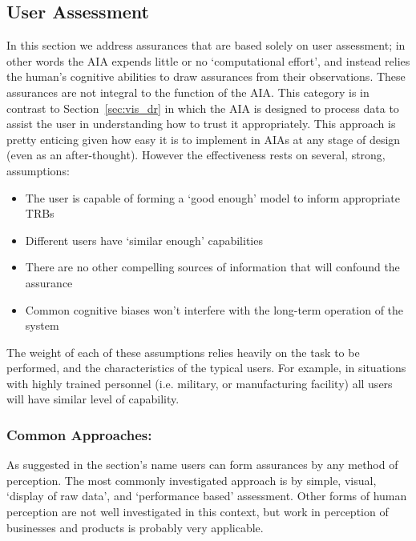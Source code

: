 
\subsection{User Assessment} \label{sec:user_assessment}
In this section we address assurances that are based solely on user assessment; in other words the AIA expends little or no `computational effort', and instead relies the human's cognitive abilities to draw assurances from their observations. These  assurances are not integral to the function of the AIA. This category is in contrast to Section~\ref{sec:vis_dr} in which the AIA is designed to process data to assist the user in understanding how to trust it appropriately. This approach is pretty enticing given how easy it is to implement in AIAs at any stage of design (even as an after-thought). However the effectiveness rests on several, strong, assumptions:

\begin{itemize}
    \item The user is capable of forming a `good enough' model to inform appropriate TRBs
    \item Different users have `similar enough' capabilities
    \item There are no other compelling sources of information that will confound the assurance
    \item Common cognitive biases won't interfere with the long-term operation of the system
\end{itemize}

The weight of each of these assumptions relies heavily on the task to be performed, and the characteristics of the typical users. For example, in situations with highly trained personnel (i.e. military, or manufacturing facility) all users will have similar level of capability.

\subsubsection{Common Approaches:}
As suggested in the section's name users can form assurances by any method of perception. The most commonly investigated approach is by simple, visual, `display of raw data', and `performance based' assessment. Other forms of human perception are not well investigated in this context, but work in perception of businesses and products is probably very applicable.

